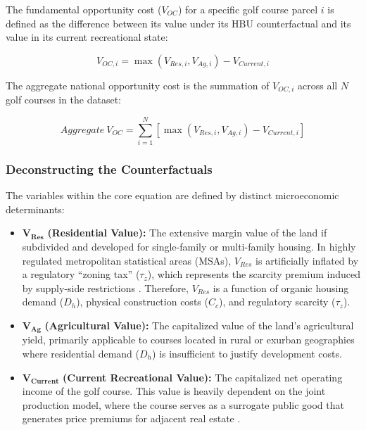\documentclass[10pt, letterpaper]{article}
\begin{document}
The fundamental opportunity cost ($V_{OC}$) for a specific golf course parcel $i$ is defined as the difference between its value under its HBU counterfactual and its value in its current recreational state:

\begin{equation}
    V_{OC, i} = \max(V_{Res, i}, V_{Ag, i}) - V_{Current, i}
\end{equation}

The aggregate national opportunity cost is the summation of $V_{OC, i}$ across all $N$ golf courses in the dataset:

\begin{equation}
    Aggregate~V_{OC} = \sum_{i=1}^{N} \left[ \max(V_{Res, i}, V_{Ag, i}) - V_{Current, i} \right]
\end{equation}

\subsubsection{Deconstructing the Counterfactuals}
The variables within the core equation are defined by distinct microeconomic determinants:

\begin{itemize}
    \item $\mathbf{V_{Res}}$ \textbf{(Residential Value):} The extensive margin value of the land if subdivided and developed for single-family or multi-family housing. In highly regulated metropolitan statistical areas (MSAs), $V_{Res}$ is artificially inflated by a regulatory ``zoning tax'' ($\tau_z$), which represents the scarcity premium induced by supply-side restrictions \parencite{Glaeser2005, Gyourko2021}. Therefore, $V_{Res}$ is a function of organic housing demand ($D_h$), physical construction costs ($C_c$), and regulatory scarcity ($\tau_z$).
    \item $\mathbf{V_{Ag}}$ \textbf{(Agricultural Value):} The capitalized value of the land's agricultural yield, primarily applicable to courses located in rural or exurban geographies where residential demand ($D_h$) is insufficient to justify development costs.
    \item $\mathbf{V_{Current}}$ \textbf{(Current Recreational Value):} The capitalized net operating income of the golf course. This value is heavily dependent on the joint production model, where the course serves as a surrogate public good that generates price premiums for adjacent real estate \parencite{Limehouse2012}. 
\end{itemize}
\end{document}
